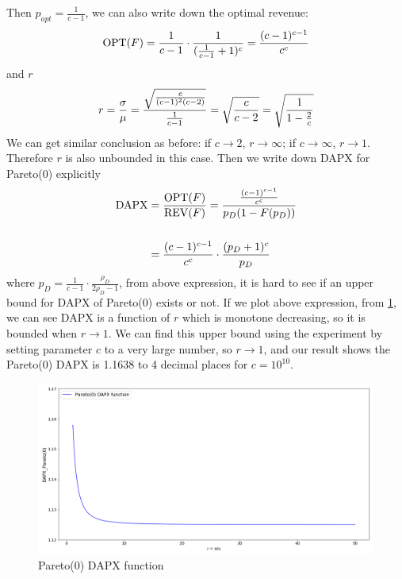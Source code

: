 Then $p_{opt} = \frac{1}{c-1}$, we can also write down the optimal revenue:
\begin{equation}\notag
	\text{OPT} (F)=  \frac{1}{c-1} \cdot \frac{1}{(\frac{1}{c-1}+1)^c} = \frac{(c-1)^{c-1}}{c^c}
\end{equation}
and $r$ 
\begin{equation}\notag
r = \frac{\sigma}{\mu} = \frac{\sqrt{\frac{c}{(c-1)^2(c-2)}}}{\frac{1}{c-1} } = \sqrt{\frac{c}{c-2}} =\sqrt{\frac{1}{1-\frac{2}{c}}} 
\end{equation}
We can get similar conclusion as before: if $c \to 2$, $r \to \infty$; if $c \to \infty$, $r \to 1$. Therefore $r$ is also unbounded in this case. Then we write down DAPX for Pareto(0) explicitly
\begin{equation}\notag
	\begin{split}
		\text{DAPX} &= \frac{\text{OPT}(F)}{\text{REV}(F)} =\frac{\frac{(c-1)^{c-1}}{c^c}}{p_D(1-F(p_D))}\\ \\ &= \frac{(c-1)^{c-1}}{c^c} \cdot \frac{(p_D +1)^c}{p_D}
	\end{split}
\end{equation} 
where $p_D = \frac{1}{c-1} \cdot \frac{\rho_{D} }{2\rho_{D} -1}$, from above expression, it is hard to see if an upper bound for DAPX of Pareto(0) exists or not. If we plot above expression, from \cref{fig:pareto_dapx_r}, we can see DAPX is a function of $r$ which is monotone decreasing, so it is bounded when $r \to 1$. We can find this upper bound using the experiment by setting parameter $c$ to a very large number, so $r \to 1$, and our result shows the Pareto(0) DAPX is 1.1638 to 4 decimal places for $c = 10^ {10}$.
\begin{figure}[H]
	\centering
	\includegraphics[width=1\textwidth]{pareto_dapx_r}
	\caption{Pareto(0) DAPX function}
	\label{fig:pareto_dapx_r}
\end{figure}
